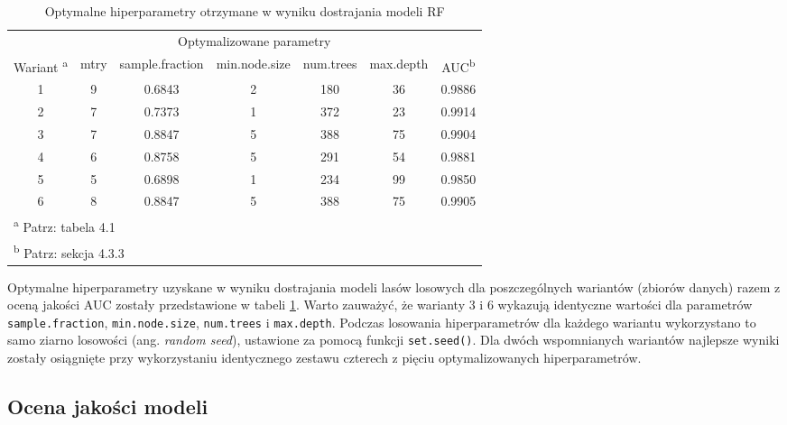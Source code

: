\documentclass{amuthesis}
\begin{document}
\hypertarget{tbl-tabela-tuning}{}
\begin{table}
\caption{\label{tbl-tabela-tuning}Optymalne hiperparametry otrzymane w wyniku dostrajania modeli RF }\tabularnewline

\centering
\begin{tabular}{ccccccc}
\toprule
\multicolumn{1}{c}{ } & \multicolumn{5}{c}{Optymalizowane parametry} & \multicolumn{1}{c}{ } \\
\cmidrule(l{3pt}r{3pt}){2-6}
Wariant \textsuperscript{a} & mtry & sample.fraction & min.node.size & num.trees & max.depth & AUC\textsuperscript{b}\\
\midrule
1 & 9 & 0.6843 & 2 & 180 & 36 & 0.9886\\
2 & 7 & 0.7373 & 1 & 372 & 23 & 0.9914\\
3 & 7 & 0.8847 & 5 & 388 & 75 & 0.9904\\
4 & 6 & 0.8758 & 5 & 291 & 54 & 0.9881\\
5 & 5 & 0.6898 & 1 & 234 & 99 & 0.9850\\
6 & 8 & 0.8847 & 5 & 388 & 75 & 0.9905\\
\bottomrule
\multicolumn{7}{l}{\textsuperscript{a} Patrz: tabela 4.1}\\
\multicolumn{7}{l}{\textsuperscript{b} Patrz: sekcja 4.3.3}\\
\end{tabular}
\end{table}

Optymalne hiperparametry uzyskane w wyniku dostrajania modeli lasów
losowych dla poszczególnych wariantów (zbiorów danych) razem z oceną
jakości AUC zostały przedstawione w tabeli \ref{tbl-tabela-tuning}.
Warto zauważyć, że warianty 3 i 6 wykazują identyczne wartości dla
parametrów \texttt{sample.fraction}, \texttt{min.node.size},
\texttt{num.trees} i \texttt{max.depth}. Podczas losowania
hiperparametrów dla każdego wariantu wykorzystano to samo ziarno
losowości (ang. \emph{random seed}), ustawione za pomocą funkcji
\texttt{set.seed()}. Dla dwóch wspomnianych wariantów najlepsze wyniki
zostały osiągnięte przy wykorzystaniu identycznego zestawu czterech z
pięciu optymalizowanych hiperparametrów.

\hypertarget{sec-model-quality-assessment}{%
\subsection{Ocena jakości modeli}\label{sec-model-quality-assessment}}
\end{document}
